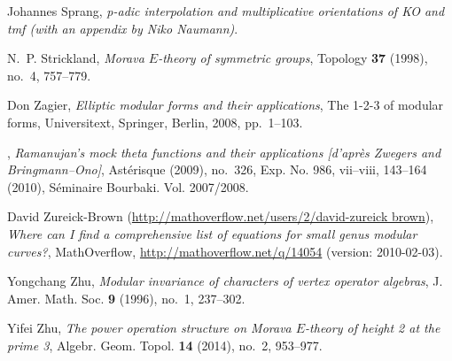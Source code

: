 \documentclass{gtpart}
\theoremstyle{definition}
\theoremstyle{remark}
\renewcommand{\=}{\approx}
\renewcommand{\-}{\sim}
\numberwithin{equation}{section}
\numberwithin{thm}{section}
\begin{document}
\begin{thebibliography}
Johannes Sprang, \emph{p-adic interpolation and multiplicative orientations of
  {KO} and tmf (with an appendix by {N}iko {N}aumann)}. 

N.~P. Strickland, \emph{Morava {$E$}-theory of symmetric groups}, Topology
  \textbf{37} (1998), no.~4, 757--779. 

Don Zagier, \emph{Elliptic modular forms and their applications}, The 1-2-3 of
  modular forms, Universitext, Springer, Berlin, 2008, pp.~1--103. 

\bysame, \emph{Ramanujan's mock theta functions and their applications
  [d'apr\`es {Z}wegers and {B}ringmann--{O}no]}, Ast\'erisque (2009), no.~326,
  Exp. No. 986, vii--viii, 143--164 (2010), S{\'e}minaire Bourbaki. Vol.
  2007/2008. 

David Zureick-Brown (\href{http://mathoverflow.net/users/2/david-zureick brown}
  {http://mathoverflow.net/users/2/david-zureick brown}),
  \emph{Where can {I} find a comprehensive list of equations for small genus
  modular curves?}, MathOverflow, \href{http://mathoverflow.net/q/14054}
  {http://mathoverflow.net/q/14054} (version: 2010-02-03).

Yongchang Zhu, \emph{Modular invariance of characters of vertex operator
  algebras}, J. Amer. Math. Soc. \textbf{9} (1996), no.~1, 237--302.

Yifei Zhu, \emph{The power operation structure on {M}orava {$E$}-theory of
  height 2 at the prime 3}, Algebr. Geom. Topol. \textbf{14} (2014), no.~2,
  953--977. 

\end{thebibliography}
\end{document}
